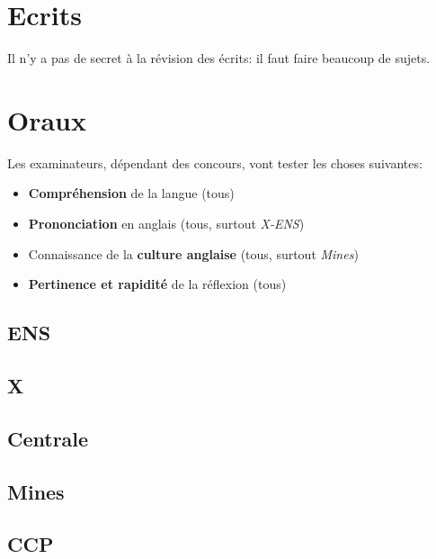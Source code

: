 \documentclass{article}
\begin{document}
\section{Ecrits}

Il n'y a pas de secret à la révision des écrits: il faut faire beaucoup de sujets.

\section{Oraux}

Les examinateurs, dépendant des concours, vont tester les choses suivantes:


\begin{itemize}
\item  \textbf{Compréhension} de la langue (tous)
\item  \textbf{Prononciation} en anglais (tous, surtout \textit{X-ENS})
\item  Connaissance de la \textbf{culture anglaise} (tous, surtout \textit{Mines})
\item  \textbf{Pertinence et rapidité} de la réflexion (tous)

\end{itemize}

\subsection{ENS}
\subsection{X}
\subsection{Centrale}
\subsection{Mines}
\subsection{CCP}
\end{document}
